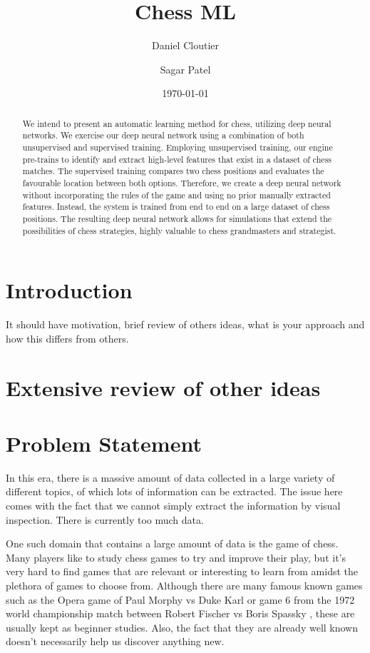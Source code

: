 \documentclass[12pt]{article}
\title{Chess ML}
\author{Daniel Cloutier \and Sagar Patel}
\date{\today}
\begin{document}
    \begin{singlespace}
        \maketitle 
    \end{singlespace}

    \begin{abstract}
        We intend to present an automatic learning method for chess, utilizing deep neural networks. We exercise our deep neural network using a combination of both unsupervised and supervised training. Employing unsupervised training, our engine pre-trains to identify and extract high-level features that exist in a dataset of chess matches. The supervised training compares two chess positions and evaluates the favourable location between both options. Therefore, we create a deep neural network without incorporating the rules of the game and using no prior manually extracted features. Instead, the system is trained from end to end on a large dataset of chess positions.
        The resulting deep neural network allows for simulations that extend the possibilities of chess strategies, highly valuable to chess grandmasters and strategist.
    \end{abstract}
        
    \section{Introduction}
    It should have motivation, brief review of others ideas, what is your approach and how this differs from others.
    
    \section{Extensive review of other ideas}

    \section{Problem Statement}

    In this era, there is a massive amount of data collected in a large variety of different topics, of which lots of information can be extracted. The issue here comes with the fact that we cannot simply extract the information by visual inspection. There is currently too much data.
    
    One such domain that contains a large amount of data is the game of chess. Many players like to study chess games to try and improve their play, but it's very hard to find games that are relevant or interesting to learn from amidst the plethora of games to choose from. Although there are many famous known games such as the Opera game of Paul Morphy vs Duke Karl or game 6 from the 1972 world championship match between Robert Fischer vs Boris Spassky \cite{chessgames}, these are usually kept as beginner studies. Also, the fact that they are already well known doesn't necessarily help us discover anything new. 
    
\end{document}
